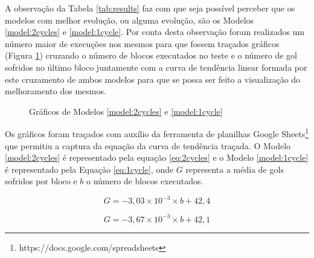 
A observação da Tabela \ref{tab:results} faz com que seja possível perceber que
os modelos com melhor evolução, ou alguma evolução, são os Modelos
\ref{model:2cycles} e \ref{model:1cycle}. Por conta desta observação foram
realizados um número maior de execuções nos mesmos para que fossem 
traçados gráficos (Figura \ref{img:graph}) cruzando o número de blocos executados no teste e o número de
gol sofridos no último bloco juntamente com a curva de tendência linear formada
por este cruzamento de ambos modelos para que se possa ser feito a visualização
do melhoramento dos mesmos.

\begin{figure}[!htb]
\centering
    \caption{\label{img:graph} Gráficos de Modelos \ref{model:2cycles} e \ref{model:1cycle}}
    \qquad
    \vspace{1.5em}
\end{figure}

Os gráficos foram traçados com auxílio da ferramenta de planilhas Google Sheets\footnote{https://docs.google.com/spreadsheets} que
permitiu a captura da equação da curva de tendência traçada. O Modelo
\ref{model:2cycles} é representado pela equação \ref{eq:2cycles} e o Modelo
\ref{model:1cycle} é representado pela Equação \ref{eq:1cycle}, onde $G$
representa a média de gols sofridos por bloco e $b$ o número de blocos executados.

\begin{equation}
    \label{eq:2cycles}
    G=-3,03\times 10^{-3}\times b+42,4
\end{equation}

\begin{equation}
    \label{eq:1cycle}
    G=-3,67\times 10^{-3} \times b+42,1
\end{equation}
